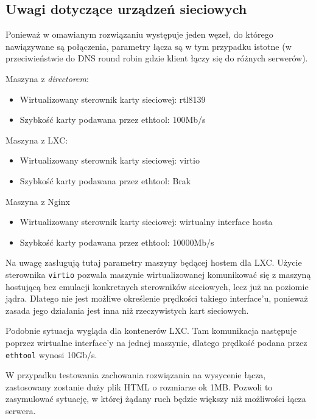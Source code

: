 \subsection{Uwagi dotyczące urządzeń sieciowych}
\label{sub:uwagi_sieciowe}
Ponieważ w omawianym rozwiązaniu występuje jeden węzeł, do którego nawiązywane są połączenia, parametry łącza są w tym przypadku istotne (w przeciwieństwie do DNS round robin gdzie klient łączy się do różnych serwerów).
\begin{description}
	\item{Maszyna z \textit{directorem}:}
		\begin{itemize}
			\item Wirtualizowany sterownik karty sieciowej: rtl8139
			\item Szybkość karty podawana przez ethtool: 100Mb/s
		\end{itemize}
	\item{Maszyna z LXC:}
		\begin{itemize}
			\item Wirtualizowany sterownik karty sieciowej: virtio
			\item Szybkość karty podawana przez ethtool: Brak
		\end{itemize}
	\item{Maszyna z Nginx}
		\begin{itemize}
			\item Wirtualizowany sterownik karty sieciowej: wirtualny interface hosta
			\item Szybkość karty podawana przez ethtool: 10000Mb/s
		\end{itemize}
\end{description}
Na uwagę zasługują tutaj parametry maszyny będącej hostem dla LXC\@.
Użycie sterownika \texttt{virtio} pozwala maszynie wirtualizowanej komunikować się z maszyną hostującą bez emulacji konkretnych sterowników sieciowych, lecz już na poziomie jądra.
Dlatego nie jest możliwe określenie prędkości takiego interface'u, ponieważ zasada jego działania jest inna niż rzeczywistych kart sieciowych.

Podobnie sytuacja wygląda dla kontenerów LXC\@.
Tam komunikacja następuje poprzez wirtualne interface'y na jednej maszynie, dlatego prędkość podana przez \texttt{ethtool} wynosi 10Gb/s.

W przypadku testowania zachowania rozwiązania na wysycenie łącza, zastosowany zostanie duży plik HTML o rozmiarze ok 1MB.
Pozwoli to zasymulować sytuację, w której żądany ruch będzie większy niż możliwości łącza serwera.
